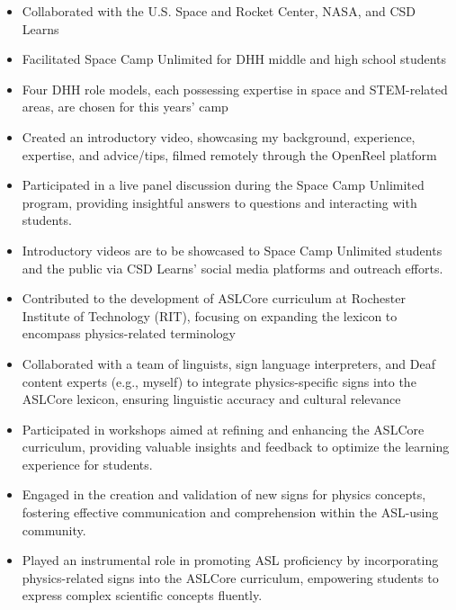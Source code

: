 \begin{itemize}
	\setlength{\itemsep}{0em}
	\item Collaborated with the U.S. Space and Rocket Center, NASA, and CSD Learns
	\item Facilitated Space Camp Unlimited for DHH middle and high school students
	\item Four DHH role models, each possessing expertise in space and STEM-related areas, are chosen for this years' camp
	\item Created an introductory video, showcasing my background, experience, expertise, and advice/tips, filmed remotely through the OpenReel platform
	\item Participated in a live panel discussion during the Space Camp Unlimited program, providing insightful answers to questions and interacting with students.
	\item Introductory videos are to be showcased to Space Camp Unlimited students and the public via CSD Learns' social media platforms and outreach efforts.
\end{itemize}

\begin{itemize}
	\setlength{\itemsep}{0em}
	\item Contributed to the development of ASLCore curriculum at Rochester Institute of Technology (RIT), focusing on expanding the lexicon to encompass physics-related terminology
	\item Collaborated with a team of linguists, sign language interpreters, and Deaf content experts (e.g., myself) to integrate physics-specific signs into the ASLCore lexicon, ensuring linguistic accuracy and cultural relevance
	\item Participated in workshops aimed at refining and enhancing the ASLCore curriculum, providing valuable insights and feedback to optimize the learning experience for students.
	\item Engaged in the creation and validation of new signs for physics concepts, fostering effective communication and comprehension within the ASL-using community.
	\item Played an instrumental role in promoting ASL proficiency by incorporating physics-related signs into the ASLCore curriculum, empowering students to express complex scientific concepts fluently.
\end{itemize}

